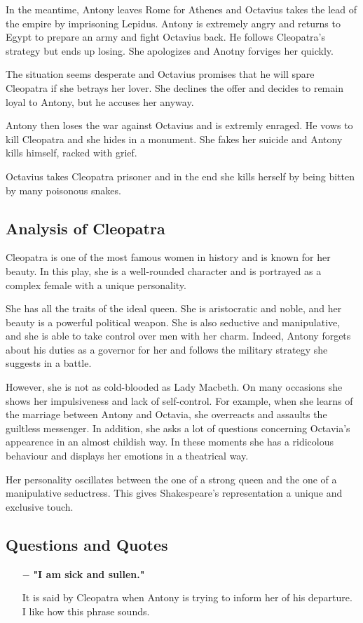 \documentclass[]{article}
\begin{document}
In the meantime, Antony leaves Rome for Athenes and Octavius takes the lead of the empire by imprisoning Lepidus. Antony is extremely angry and returns to Egypt to prepare an army and fight Octavius back. He follows Cleopatra's strategy but ends up losing. She apologizes and Anotny forviges her quickly.

The situation seems desperate and Octavius promises that he will spare Cleopatra if she betrays her lover. She declines the offer and decides to remain loyal to Antony, but he accuses her anyway.

Antony then loses the war against Octavius and is extremly enraged. He vows to kill Cleopatra and she hides in a monument. She fakes her suicide and Antony kills himself, racked with grief. 

Octavius takes Cleopatra prisoner and in the end she kills herself by being bitten by many poisonous snakes.

\subsection*{Analysis of Cleopatra}
\hspace{1em}
Cleopatra is one of the most famous women in history and is known for her beauty. In this play, she is a well-rounded character and is portrayed as a complex female with a unique personality.

She has all the traits of the ideal queen. She is aristocratic and noble, and her beauty is a powerful political weapon. She is also seductive and manipulative, and she is able to take control over men with her charm. Indeed, Antony forgets about his duties as a governor for her and follows the military strategy she suggests in a battle.

However, she is not as cold-blooded as Lady Macbeth. On many occasions she shows her impulsiveness and lack of self-control. For example, when she learns of the marriage between Antony and Octavia, she overreacts and assaults the guiltless messenger. In addition, she asks a lot of questions concerning Octavia's appearence in an almost childish way. In these moments she has a ridicolous behaviour and displays her emotions in a theatrical way. 

Her personality oscillates between the one of a strong queen and the one of a manipulative seductress. This gives Shakespeare's representation a unique and exclusive touch.

\subsection*{Questions and Quotes}
\begin{itemize}
    \item[$-$] \textbf{"I am sick and sullen."} \par
        It is said by Cleopatra when Antony is trying to inform her of his departure. I like how this phrase sounds.
\end{itemize}
\end{document}
